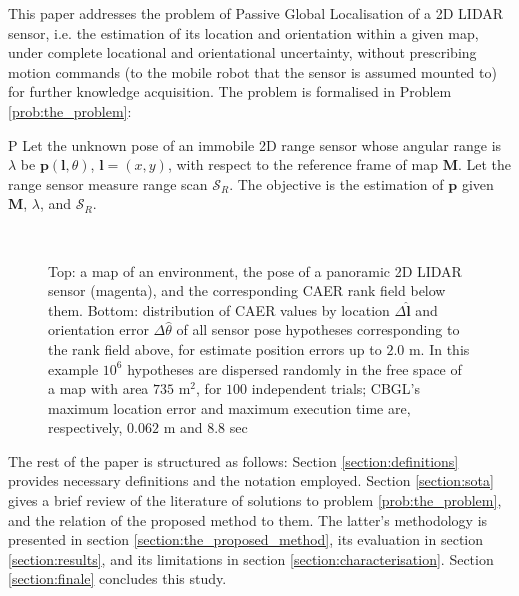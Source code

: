 This paper addresses the problem of Passive Global Localisation of a 2D LIDAR
sensor, i.e. the estimation of its location and orientation within a given map,
under complete locational and orientational uncertainty, without prescribing
motion commands (to the mobile robot that the sensor is assumed mounted to) for
further knowledge acquisition. The problem is formalised in Problem
\ref{prob:the_problem}:

\begin{customprb}{P}
  \label{prob:the_problem}
  Let the unknown pose of an immobile 2D range sensor whose angular range is
  $\lambda$ be $\bm{p}(\bm{l},\theta)$, $\bm{l} = (x,y)$, with respect to the
  reference frame of map $\bm{M}$. Let the range sensor measure range scan
  $\mathcal{S}_R$. The objective is the estimation of $\bm{p}$ given $\bm{M}$,
  $\lambda$, and $\mathcal{S}_R$.
\end{customprb}

\begin{figure}\vspace{0.4em}
  \subfloat{    \label{fig:a}} \vspace{-1.7cm}\\
  \subfloat{\hspace{-0.3cm} \label{fig:b}}
  \caption{\small Top: a map of an
           environment, the pose of a panoramic 2D LIDAR sensor (magenta), and
           the corresponding CAER rank field below them. Bottom: distribution
           of CAER values by location $\Delta \hat{\bm{l}}$ and orientation
           error $\Delta \hat{\theta}$ of all sensor pose hypotheses
           corresponding to the rank field above, for estimate position errors
           up to $2.0$ m. In this example $10^6$ hypotheses are dispersed
           randomly in the free space of a map with area $735$ m$^2$, for $100$
           independent trials; CBGL's maximum location error and maximum
           execution time are, respectively, $0.062$ m and $8.8$ sec }
  \vspace{-0.75cm}
  \label{fig:face}
\end{figure}

The rest of the paper is structured as follows: Section
\ref{section:definitions} provides necessary definitions and the notation
employed. Section \ref{section:sota} gives a brief review of the
literature of solutions to problem \ref{prob:the_problem}, and the relation of
the proposed method to them.  The latter's methodology is presented in section
\ref{section:the_proposed_method}, its evaluation in section
\ref{section:results}, and its limitations in section
\ref{section:characterisation}. Section \ref{section:finale} concludes this
study.
